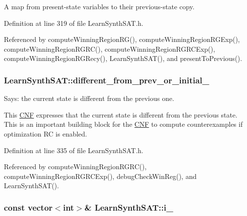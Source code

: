 A map from present-\/state variables to their previous-\/state copy. 



Definition at line 319 of file Learn\-Synth\-S\-A\-T.\-h.



Referenced by compute\-Winning\-Region\-R\-G(), compute\-Winning\-Region\-R\-G\-Exp(), compute\-Winning\-Region\-R\-G\-R\-C(), compute\-Winning\-Region\-R\-G\-R\-C\-Exp(), compute\-Winning\-Region\-R\-G\-Recy(), Learn\-Synth\-S\-A\-T(), and present\-To\-Previous().

\hypertarget{classLearnSynthSAT_a1b0ed51f21b9fbb8cc0954e011968389}{
\subsubsection[{different\-\_\-from\-\_\-prev\-\_\-or\-\_\-initial\-\_\-}]{ Learn\-Synth\-S\-A\-T\-::different\-\_\-from\-\_\-prev\-\_\-or\-\_\-initial\-\_\-\hspace{0.3cm}{\ttfamily [protected]}}}\label{classLearnSynthSAT_a1b0ed51f21b9fbb8cc0954e011968389}


Says\-: the current state is different from the previous one. 

This \hyperlink{classCNF}{C\-N\-F} expresses that the current state is different from the previous state. This is an important building block for the \hyperlink{classCNF}{C\-N\-F} to compute counterexamples if optimization R\-C is enabled. 

Definition at line 335 of file Learn\-Synth\-S\-A\-T.\-h.



Referenced by compute\-Winning\-Region\-R\-G\-R\-C(), compute\-Winning\-Region\-R\-G\-R\-C\-Exp(), debug\-Check\-Win\-Reg(), and Learn\-Synth\-S\-A\-T().

\hypertarget{classLearnSynthSAT_ab5eac67e9f0f27b5b08f6a5e054d59c4}{
\subsubsection[{i\-\_\-}]{\setlength{\rightskip}{0pt plus 5cm}const vector$<$int$>$\& Learn\-Synth\-S\-A\-T\-::i\-\_\-\hspace{0.3cm}{\ttfamily [protected]}}}\label{classLearnSynthSAT_ab5eac67e9f0f27b5b08f6a5e054d59c4}


